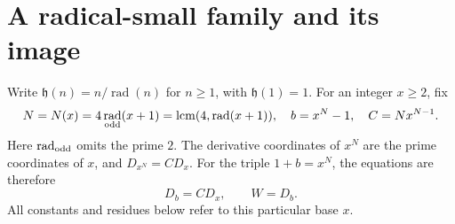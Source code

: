 \documentclass[11pt,a4paper]{article}
\theoremstyle{definition}\newtheorem{question}[theorem]{Question}
\theoremstyle{remark}\newtheorem{remark}[theorem]{Remark}
\newcommand{\hh}{\mathfrak h}\newcommand{\ee}{\mathrm e}
\DeclareMathOperator{\rad}{rad}\DeclareMathOperator{\supp}{supp}
\DeclareMathOperator{\lcm}{lcm}\DeclareMathOperator{\ord}{ord}
\begin{document}
\section{A radical-small family and its image}\label{sec:extension}
Write $\hh(n)=n/\rad(n)$ for $n\ge1$, with $\hh(1)=1$.
For an integer $x\ge2$, fix
\begin{equation}\label{eq:family}
 N=N(x)=4\rad_{\rm odd}(x+1)=\lcm(4,\rad(x+1)),\quad
 b=x^N-1,\quad C=Nx^{N-1}.
\end{equation}
Here $\rad_{\rm odd}$ omits the prime $2$. The derivative coordinates
of $x^N$ are the prime coordinates of $x$, and $D_{x^N}=C D_x$.
For the triple $1+b=x^N$, the equations are therefore
\begin{equation}\label{eq:two-row}
 D_b=C D_x,\qquad W=D_b.
\end{equation}
All constants and residues below refer to this particular base $x$.
\end{document}
